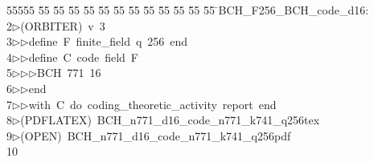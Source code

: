 %
%
\begin{tabbing}
55555 \= 55 \= 55 \= 55 \= 55 \= 55 \= 55 \= 55 \= 55 \= 55 \= 55 \= 55 \= 55 \= \>BCH\_F256\_BCH\_code\_d16:\\[0pt]
2\>$\triangleright$\>(ORBITER)\ v\ 3\ \\[0pt]
3\>$\triangleright$\>$\triangleright$\>define\ F\ finite\_field\ q\ 256\ end\ \\[0pt]
4\>$\triangleright$\>$\triangleright$\>define\ C\ code\ field\ F\ \\[0pt]
5\>$\triangleright$\>$\triangleright$\>$\triangleright$\>BCH\ 771\ 16\ \\[0pt]
6\>$\triangleright$\>$\triangleright$\>end\ \\[0pt]
7\>$\triangleright$\>$\triangleright$\>with\ C\ do\ coding\_theoretic\_activity\ report\ end\\[0pt]
8\>$\triangleright$\>(PDFLATEX)\ BCH\_n771\_d16\_code\_n771\_k741\_q256tex\\[0pt]
9\>$\triangleright$\>(OPEN)\ BCH\_n771\_d16\_code\_n771\_k741\_q256pdf\\[0pt]
10\>\end{tabbing}
